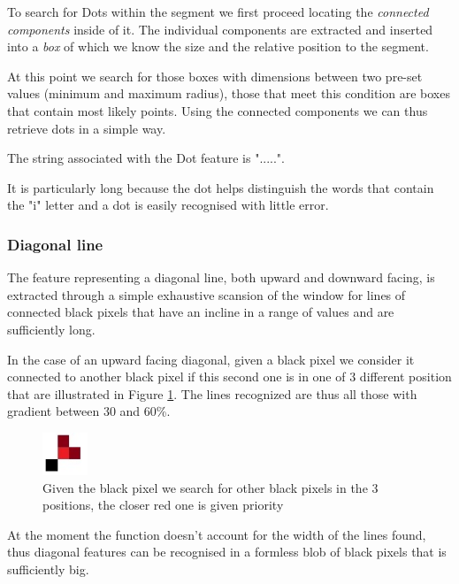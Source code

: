 To search for Dots within the segment we first proceed locating the \emph{connected components} inside of it. The individual components are extracted and inserted into a \emph{box} of which we know the size and the relative position to the segment.


At this point we search for those boxes with dimensions between two pre-set values (minimum and maximum radius), those that meet this condition are boxes that contain most likely points.
Using the connected components we can thus retrieve dots in a simple way.

The string associated with the Dot feature is ".....".

It is particularly long because the dot helps distinguish the words that contain the "i" letter and a dot is easily recognised with little error.

\subsubsection{Diagonal line}

The feature representing a diagonal line, both upward and downward facing, is extracted through a simple exhaustive scansion of the window for lines of connected black pixels that have an incline in a range of values and are sufficiently long.

In the case of an upward facing diagonal, given a black pixel we consider it connected to another black pixel if this second one is in one of 3 different position that are illustrated in Figure \ref{pixels}. The lines recognized are thus all those with gradient between 30 and 60\%.

\begin{figure}[!htpb]
\centering
\includegraphics[width=0.12\textwidth]{images/diagP.jpg}
\caption{Given the black pixel we search for other black pixels in the 3 positions, the closer red one is given priority}
\label{pixels}
\end{figure} 
\vspace{3mm}
At the moment the function doesn't account for the width of the lines found, thus diagonal features can be recognised in a formless blob of black pixels that is sufficiently big. 

